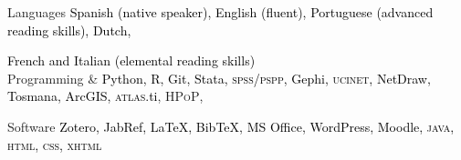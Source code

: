 





\begin{cvskills}

\cvskill
{Languages} 
{\textcolor{black}{Spanish (native speaker), English (fluent), Portuguese (advanced reading skills), Dutch,}} 

\cvskill
{} 
{\textcolor{black}{French and Italian (elemental reading skills)}} \\

\cvskill
{Programming \&} 
{\textcolor{black}{Python, R, Git, Stata, {\scshape spss/pspp}, Gephi, {\scshape ucinet}, NetDraw, Tosmana, ArcGIS, {\scshape atlas}.ti}, {\scshape HPoP},}

\cvskill
{Software} 
{\textcolor{black}{Zotero, JabRef, {\LaTeX}, Bib{\TeX}, MS Office, WordPress, Moodle, {\scshape java}, {\scshape html}, {\scshape css}, {\scshape xhtml}}} \\

\end{cvskills}
